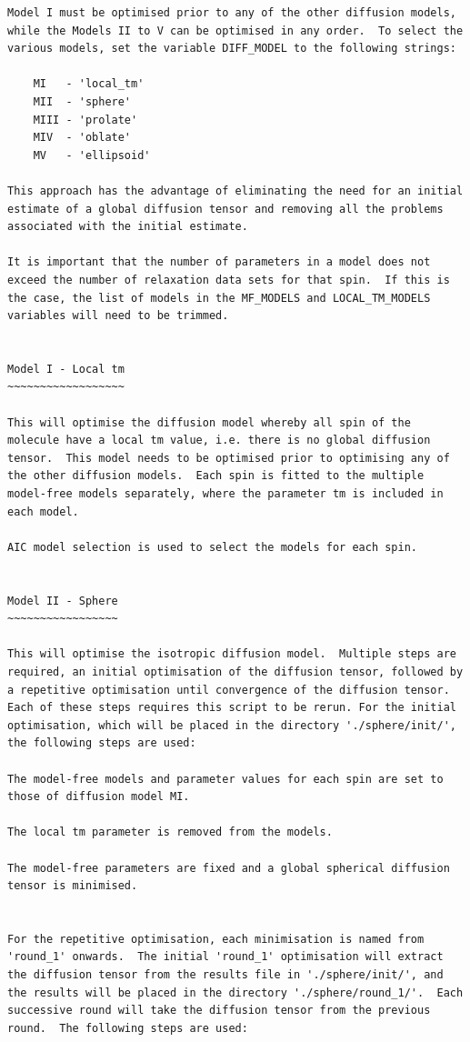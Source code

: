 \begin{htmlonly}
\begin{htmlonly}
\begin{lstlisting}
Model I must be optimised prior to any of the other diffusion models, while the Models II to V can be optimised in any order.  To select the various models, set the variable DIFF_MODEL to the following strings:

    MI   - 'local_tm'
    MII  - 'sphere'
    MIII - 'prolate'
    MIV  - 'oblate'
    MV   - 'ellipsoid'

This approach has the advantage of eliminating the need for an initial estimate of a global diffusion tensor and removing all the problems associated with the initial estimate.

It is important that the number of parameters in a model does not exceed the number of relaxation data sets for that spin.  If this is the case, the list of models in the MF_MODELS and LOCAL_TM_MODELS variables will need to be trimmed.


Model I - Local tm
~~~~~~~~~~~~~~~~~~

This will optimise the diffusion model whereby all spin of the molecule have a local tm value, i.e. there is no global diffusion tensor.  This model needs to be optimised prior to optimising any of the other diffusion models.  Each spin is fitted to the multiple model-free models separately, where the parameter tm is included in each model.

AIC model selection is used to select the models for each spin.


Model II - Sphere
~~~~~~~~~~~~~~~~~

This will optimise the isotropic diffusion model.  Multiple steps are required, an initial optimisation of the diffusion tensor, followed by a repetitive optimisation until convergence of the diffusion tensor.  Each of these steps requires this script to be rerun. For the initial optimisation, which will be placed in the directory './sphere/init/', the following steps are used:

The model-free models and parameter values for each spin are set to those of diffusion model MI.

The local tm parameter is removed from the models.

The model-free parameters are fixed and a global spherical diffusion tensor is minimised.


For the repetitive optimisation, each minimisation is named from 'round_1' onwards.  The initial 'round_1' optimisation will extract the diffusion tensor from the results file in './sphere/init/', and the results will be placed in the directory './sphere/round_1/'.  Each successive round will take the diffusion tensor from the previous round.  The following steps are used:


\end{lstlisting}
\end{htmlonly}
\end{htmlonly}

